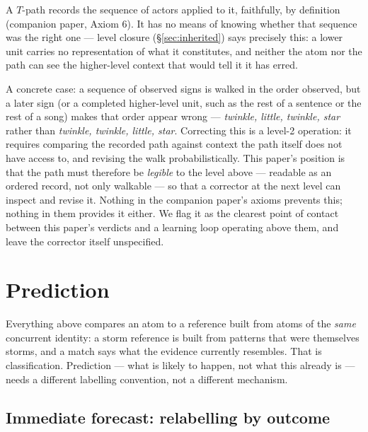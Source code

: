 \documentclass[12pt, a4paper]{article}
\begin{document}
A $T$-path records the sequence of actors applied to it, faithfully,
by definition (companion paper, Axiom 6). It has no means of knowing
whether that sequence was the right one --- level closure
(\S\ref{sec:inherited}) says precisely this: a lower unit carries no
representation of what it constitutes, and neither the atom nor the
path can see the higher-level context that would tell it it has erred.

A concrete case: a sequence of observed signs is walked in the order
observed, but a later sign (or a completed higher-level unit, such as
the rest of a sentence or the rest of a song) makes that order appear
wrong --- \emph{twinkle, little, twinkle, star} rather than
\emph{twinkle, twinkle, little, star}. Correcting this is a level-2
operation: it requires comparing the recorded path against context the
path itself does not have access to, and revising the walk
probabilistically. This paper's position is that the path must
therefore be \emph{legible} to the level above --- readable as an
ordered record, not only walkable --- so that a corrector at the next
level can inspect and revise it. Nothing in the companion paper's
axioms prevents this; nothing in them provides it either. We flag it
as the clearest point of contact between this paper's verdicts and a
learning loop operating above them, and leave the corrector itself
unspecified.

\section{Prediction}
\label{sec:prediction}

Everything above compares an atom to a reference built from atoms of
the \emph{same} concurrent identity: a $\mathrm{storm}$ reference is
built from patterns that were themselves storms, and a match says what
the evidence currently resembles. That is classification. Prediction
--- what is likely to happen, not what this already is --- needs a
different labelling convention, not a different mechanism.

\subsection{Immediate forecast: relabelling by outcome}
\label{subsec:immediate_forecast}
\end{document}
